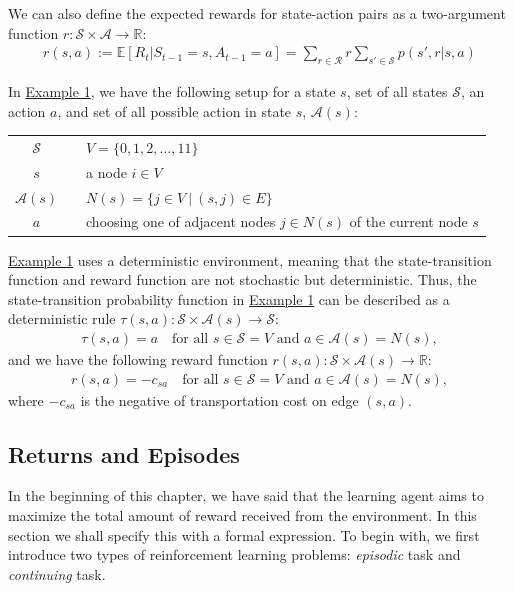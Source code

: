 We can also define the expected rewards for state-action pairs as a two-argument function $r:\mathcal{S}\times\mathcal{A}\rightarrow\mathbb{R}$:
\begin{align}
\label{eq:reward function}
r(s,a) := \mathbb{E}[R_t|S_{t-1}=s, A_{t-1}=a]=\sum_{r\in\mathcal{R}}r\sum_{s'\in\mathcal{S}}p(s',r|s,a)
\end{align}

In \hyperref[fig:toy graph]{Example 1}, we have the following setup for a state $s$, set of all states $\mathcal{S}$, an action $a$, and set of all possible action in state $s$, $\mathcal{A}(s)$:

\begin{table}[!htbp]
\begin{tabular}{ccl}
    $\mathcal{S}$ & & $V = \{0,1,2, \dots, 11\}$  \\[0.5em]
    $s$ & & a node $i \in V$ \\[0.5em]
    $\mathcal{A}(s)$ & & $N(s) = \{j \in V \ | \ (s, j) \in E \}$\\[0.5em]
    $a$ & & choosing one of adjacent nodes $j \in N(s)$ of the current node $s$
\end{tabular}
\end{table}

\hyperref[fig:toy graph]{Example 1} uses a deterministic environment, meaning that the state-transition function and reward function are not stochastic but deterministic. Thus, the state-transition probability function in \hyperref[fig:toy graph]{Example 1} can be described as a deterministic rule $\tau(s,a): \mathcal{S} \times \mathcal{A}(s) \rightarrow \mathcal{S}$:
\begin{align}
    \tau(s,a) = a \quad \text{for all } s\in \mathcal{S} = V \text{ and } a \in \mathcal{A}(s) = N(s),
\end{align}
and we have the following reward function $r(s,a): \mathcal{S} \times \mathcal{A}(s) \rightarrow \mathbb{R}$:
\begin{align}
    r(s,a) = -c_{sa}  \quad \text{for all } s\in \mathcal{S} = V \text{ and } a \in \mathcal{A}(s) = N(s),
\end{align}
where $-c_{sa}$ is the negative of transportation cost on edge $(s,a)$.

\subsection{Returns and Episodes}
\label{subsec:returns and episodes}
In the beginning of this chapter, we have said that the learning agent aims to maximize the total amount of reward received from the environment. In this section we shall specify this with a formal expression. To begin with, we first introduce two types of reinforcement learning problems: \textit{episodic} task and \textit{continuing} task.

